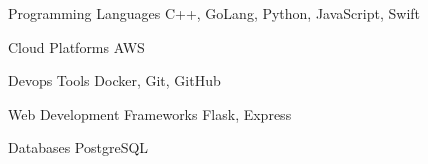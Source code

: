 

\begin{cvskills}

    \cvskill
      {Programming Languages} %
      {C++, GoLang, Python, JavaScript, Swift} %
  

    \cvskill
      {Cloud Platforms} %
      {AWS} %
  

    \cvskill
      {Devops Tools} %
      {Docker, Git, GitHub} %
  

    \cvskill
      {Web Development Frameworks} %
      {Flask, Express} %
  

    \cvskill
      {Databases} %
      {PostgreSQL} %
  
\end{cvskills}

